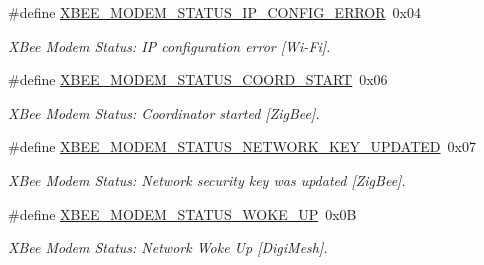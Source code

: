 \begin{DoxyCompactItemize}
\mbox{\label{group__xbee__device_ga8fc9e45b59d9cd0d41c8c1afde96c0dd}} 
\#define \hyperlink{group__xbee__device_ga8fc9e45b59d9cd0d41c8c1afde96c0dd}{X\+B\+E\+E\+\_\+\+M\+O\+D\+E\+M\+\_\+\+S\+T\+A\+T\+U\+S\+\_\+\+I\+P\+\_\+\+C\+O\+N\+F\+I\+G\+\_\+\+E\+R\+R\+OR}~0x04
\begin{DoxyCompactList}\small\item\em X\+Bee Modem Status\+: IP configuration error \mbox{[}Wi-\/\+Fi\mbox{]}. \end{DoxyCompactList}\item 
\mbox{\label{group__xbee__device_ga057ed15b292ea3e48a138c6737fb0339}} 
\#define \hyperlink{group__xbee__device_ga057ed15b292ea3e48a138c6737fb0339}{X\+B\+E\+E\+\_\+\+M\+O\+D\+E\+M\+\_\+\+S\+T\+A\+T\+U\+S\+\_\+\+C\+O\+O\+R\+D\+\_\+\+S\+T\+A\+RT}~0x06
\begin{DoxyCompactList}\small\item\em X\+Bee Modem Status\+: Coordinator started \mbox{[}Zig\+Bee\mbox{]}. \end{DoxyCompactList}\item 
\mbox{\label{group__xbee__device_ga465cfa03dffba6584345938283b1c200}} 
\#define \hyperlink{group__xbee__device_ga465cfa03dffba6584345938283b1c200}{X\+B\+E\+E\+\_\+\+M\+O\+D\+E\+M\+\_\+\+S\+T\+A\+T\+U\+S\+\_\+\+N\+E\+T\+W\+O\+R\+K\+\_\+\+K\+E\+Y\+\_\+\+U\+P\+D\+A\+T\+ED}~0x07
\begin{DoxyCompactList}\small\item\em X\+Bee Modem Status\+: Network security key was updated \mbox{[}Zig\+Bee\mbox{]}. \end{DoxyCompactList}\item 
\mbox{\label{group__xbee__device_gafdc21028c63554f391dc8f88e9fb82ef}} 
\#define \hyperlink{group__xbee__device_gafdc21028c63554f391dc8f88e9fb82ef}{X\+B\+E\+E\+\_\+\+M\+O\+D\+E\+M\+\_\+\+S\+T\+A\+T\+U\+S\+\_\+\+W\+O\+K\+E\+\_\+\+UP}~0x0B
\begin{DoxyCompactList}\small\item\em X\+Bee Modem Status\+: Network Woke Up \mbox{[}Digi\+Mesh\mbox{]}. \end{DoxyCompactList}\item 
\mbox{\label{group__xbee__device_ga1a7c823908fa0c74b692665b9a76ac99}} 

\end{DoxyCompactItemize}
